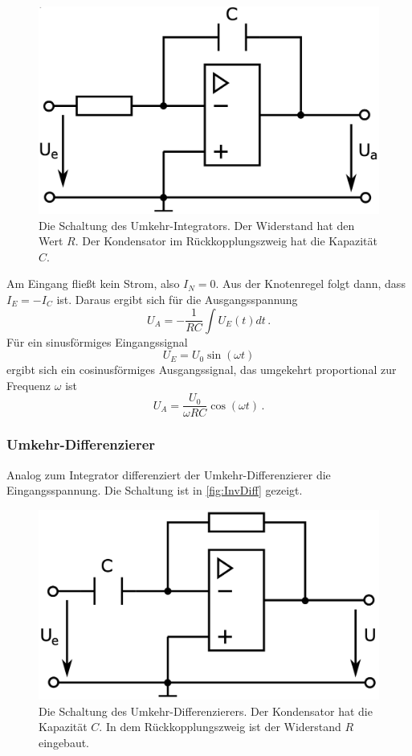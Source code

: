\begin{figure}
    \centering
    \includegraphics[width=0.7\linewidth]{./figures/2_Umkehr.png}
    \caption{Die Schaltung des Umkehr-Integrators. Der Widerstand hat den Wert $R$. Der Kondensator im Rückkopplungszweig hat die Kapazität $C$. \cite{Anleitung}} %
    \label{fig:UmkehrInt}
\end{figure}

Am Eingang fließt kein Strom, also $I_N = 0$. Aus der Knotenregel folgt dann, dass $I_E = - I_C$ ist. Daraus ergibt sich für die Ausgangsspannung
\begin{equation}
    U_A = - \frac{1}{R C} \int U_E(t) dt \, .
    \label{eq:Integrator}
\end{equation}
Für ein sinusförmiges Eingangssignal
\begin{equation}
    U_E = U_0 \sin(\omega t)
    \label{eq:Sinus}
\end{equation}
ergibt sich ein cosinusförmiges Ausgangssignal, das umgekehrt proportional zur Frequenz $\omega$ ist
\begin{equation*}
    U_A = \frac{U_0}{\omega R C} \cos(\omega t) \, .
\end{equation*}


\subsubsection{Umkehr-Differenzierer}
Analog zum Integrator differenziert der Umkehr-Differenzierer die Eingangsspannung. Die Schaltung ist in \autoref{fig:InvDiff} gezeigt.

\begin{figure}
    \centering
    \includegraphics[width=0.7\linewidth]{./figures/3_InvDiff.png}
    \caption{Die Schaltung des Umkehr-Differenzierers. Der Kondensator hat die Kapazität $C$. In dem Rückkopplungszweig ist der Widerstand $R$ eingebaut. \cite{Anleitung}}
    \label{fig:InvDiff}
\end{figure}

